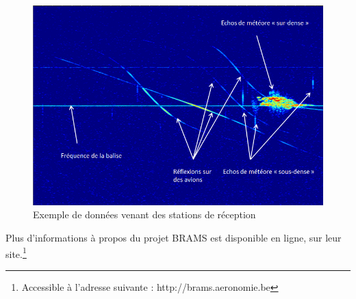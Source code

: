 \documentclass[11pt]{article}
\begin{document}
\begin{figure}[t]
    \begin{center}
        \includegraphics[scale=0.493]{spectrogramme.png}
        \caption{Exemple de données venant des stations de réception}
    \end{center}
\end{figure}

\vspace{10pt}
Plus d'informations à propos du projet BRAMS est disponible en ligne, sur leur site.\footnote{Accessible à l’adresse suivante : http://brams.aeronomie.be}

\newpage
\end{document}

